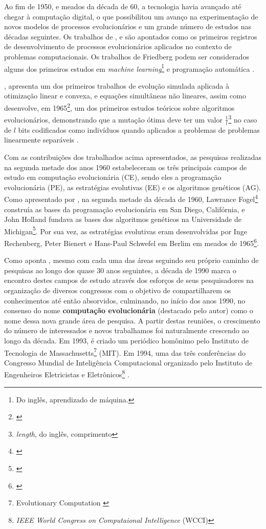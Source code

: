 Ao fim de 1950, e meados da década de 60, a tecnologia havia avançado até chegar à computação digital, o que possibilitou um avanço na experimentação de novos modelos de processos evolucionários e um grande número de estudos nas décadas seguintes. Os trabalhos de \cite{learning_machine_1958}, \cite{Friedberg1959ALM} e \cite{bremermann_optimization_1962} são apontados como os primeiros registros de desenvolvimento de processos evolucionários aplicados no contexto de problemas computacionais. Os trabalhos de Friedberg podem ser considerados alguns dos primeiros estudos em \textit{machine learning}\footnote{Do inglês, aprendizado de máquina.} e programação automática \cite{back_handbook_1997}.

\cite{bremermann_optimization_1962}, apresenta um dos primeiros trabalhos de evolução simulada aplicada à otimização linear e convexa, e equações simultâneas não lineares, assim como desenvolve, em 1965\footnote{\cite{search_evolution_biophysics_1965}}, um dos primeiros estudos teóricos sobre algoritmos evolucionários, demonstrando que a mutação ótima deve ter um valor $\frac{1}{l}$\footnote{\textit{length}, do inglês, comprimento} no caso de $l$ bits codificados como indivíduos quando aplicados a problemas de problemas linearmente separáveis \cite{back_handbook_1997}.

Com as contribuições dos trabalhados acima apresentados, as pesquisas realizadas na segunda metade dos anos 1960 estabeleceram os três principais campos de estudo em computação evolucionária (CE), sendo eles a programação evolucionária (PE), as estratégias evolutivas (EE) e os algoritmos genéticos (AG). Como apresentado por \cite{back_handbook_1997}, na segunda metade da década de 1960, Lawrance Fogel\footnote{\cite{Fogel1966ArtificialIT}} construía as bases da programação evolucionária em San Diego, Califórnia, e John Holland fundava as bases dos algoritmos genéticos na Universidade de Michigan\footnote{\cite{holland_1962}}. Por sua vez, as estratégias evolutivas eram desenvolvidas por Inge Rechenberg, Peter Bienert e Hans-Paul Schwefel em Berlim em meados de 1965\footnote{\cite{rechenberg_cybernetic_1965}}.

Como aponta \cite{back_handbook_1997}, mesmo com cada uma das áreas seguindo seu próprio caminho de pesquisas ao longo dos quase 30 anos seguintes, a década de 1990 marca o encontro destes campos de estudo através dos esforços de seus pesquisadores na organização de diversos congressos com o objetivo de compartilharem os conhecimentos até então absorvidos, culminando, no início dos anos 1990, no consenso do nome \textbf{computação evolucionária} (destacado pelo autor) como o nome dessa nova grande área de pesquisa. A partir destas reuniões, o crescimento do número de interessados e novos trabalhamos foi naturalmente crescendo ao longo da década. Em 1993, é criado um periódico homônimo pelo Instituto de Tecnologia de Massachusetts\footnote{Evolutionary Computation \citeyearpar{noauthor_editorial_1993}} (MIT). Em 1994, uma das três conferências do Congresso Mundial de Inteligência Computacional organizado pelo Instituto de Engenheiros Eletricistas e Eletrônicos\footnote{\textit{IEEE World Congress on Computaional Intelligence} (WCCI)} .

